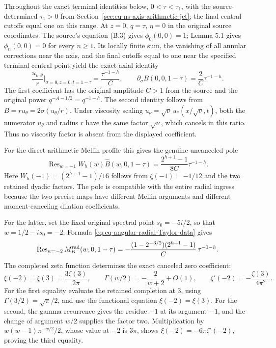 Throughout the exact terminal identities below, $0<\tau<\tau_1$, with the source-determined $\tau_1>0$ from Section~\ref{sec:cq-ns-axis-arithmetic-jet}; the final central cutoffs equal one on this range. At $z=0$, $q=\tau$, $\eta=0$ in the original source coordinates.
The source's equation (B.3) gives $\phi_0(0,0)=1$; Lemma 5.1
gives $\phi_n(0,0)=0$ for every $n\geq1$.
Its locally finite sum, the vanishing of all annular corrections
near the axis, and the final cutoffs equal to one near the
specified terminal central point yield the exact axial identity
\begin{equation}
 \frac{u_{\nu,\theta}}r\bigg|_{\sigma=0,z=0,t=1-\tau}
          =\frac{\tau^{-1-h}}C,\qquad
 \partial_\sigma B(0,0,1-\tau)=\frac2C\tau^{-1-h}.
 \label{eq:cq-actual-axis-angular-coefficient}
\end{equation}
The first coefficient has the original amplitude $C>1$ from
the source and the original power
$q^{-A-1/2}=q^{-1-h}$. The second identity follows from
$B=r u_\theta=2\sigma(u_\theta/r)$.
Under viscosity scaling $u_\nu=\sqrt\nu\,u_*(x/\sqrt\nu,t)$,
both the numerator $u_\theta$ and radius $r$ have the same
factor $\sqrt\nu$, which cancels in this ratio. Thus no
viscosity factor is absent from the displayed coefficient.

For the direct arithmetic Mellin profile this gives the genuine
uncanceled pole
\[
 \operatorname{Res}_{w=-1}W_h(w)\widehat B(w,0,1-\tau)
       =\frac{2^{h+1}-1}{8C}\tau^{-1-h}.
\]
Here $W_h(-1)=(2^{h+1}-1)/16$ follows from
$\zeta(-1)=-1/12$ and the two retained dyadic factors.
The pole is compatible with the entire radial ingress because
the two precise maps have different Mellin arguments and
different moment-canceling dilation coefficients.

For the latter, set the fixed original spectral point
$s_0=-5i/2$, so that $w=1/2-is_0=-2$.
Formula \eqref{eq:cq-angular-radial-Taylor-data} gives
\[
 \operatorname{Res}_{w=-2}M_B^{\rm rad}(w,0,1-\tau)
   =-\frac{(1-2^{-3/2})(2^{h+1}-1)}C\,\tau^{-1-h}.
\]
The completed zeta function determines the exact canceled
zero coefficient:
\[
 \xi(-2)=\xi(3)=\frac{3\zeta(3)}{2\pi},\qquad
 \Gamma(w/2)=-\frac2{w+2}+O(1),\qquad
 \zeta'(-2)=-\frac{\zeta(3)}{4\pi^2}.
\]
For the first equality evaluate the retained completion at
$3$, using $\Gamma(3/2)=\sqrt\pi/2$, and use the functional
equation $\xi(-2)=\xi(3)$. For the second, the gamma recurrence
gives the residue $-1$ at its argument $-1$, and the change
of argument $w/2$ supplies the factor two. Multiplication by
$w(w-1)\pi^{-w/2}/2$, whose value at $-2$ is $3\pi$, shows
$\xi(-2)=-6\pi\zeta'(-2)$, proving the third equality.

